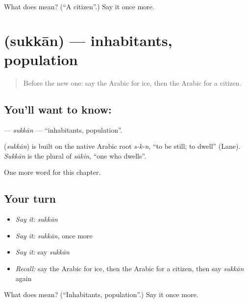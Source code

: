 \begin{tcolorbox}[breakable,colback=teal!4,colframe=teal!35!black,title={Before you move on}]
What does  mean? (\textquotedblleft{}A citizen\textquotedblright{}.) Say it once more.
\end{tcolorbox}
\section[\texorpdfstring{\ar{سكان} (sukkān)}{سكان (sukkān)}]{ (sukkān) — inhabitants, population}

\label{lesson:AR-C236-sukkan}



\begin{quote}
Before the new one: say the Arabic for ice, then the Arabic for a citizen.
\end{quote}

\subsection*{You'll want to know: }
\textbf{} — \emph{sukkān} — \textquotedblleft{}inhabitants, population\textquotedblright{}.

\begin{cousinweb}
\textbf{} (\emph{sukkān}) is built on the native Arabic root \emph{s-k-n}, \textquotedblleft{}to be still; to dwell\textquotedblright{} (Lane). \emph{Sukkān} is the plural of \emph{sākin}, \textquotedblleft{}one who dwells\textquotedblright{}.
\end{cousinweb}

\begin{grammarlens}[title={What you've built}]
One more word for this chapter.
\end{grammarlens}

\subsection*{Your turn}
\begin{itemize}
\raggedright
  \item \emph{Say it:} \emph{sukkān}
  \item \emph{Say it:} \emph{sukkān}, once more
  \item \emph{Say it:} say \emph{sukkān}
  \item \emph{Recall:} say the Arabic for ice, then the Arabic for a citizen, then say \emph{sukkān} again
\end{itemize}

\begin{tcolorbox}[breakable,colback=teal!4,colframe=teal!35!black,title={Before you move on}]
What does  mean? (\textquotedblleft{}Inhabitants, population\textquotedblright{}.) Say it once more.
\end{tcolorbox}
